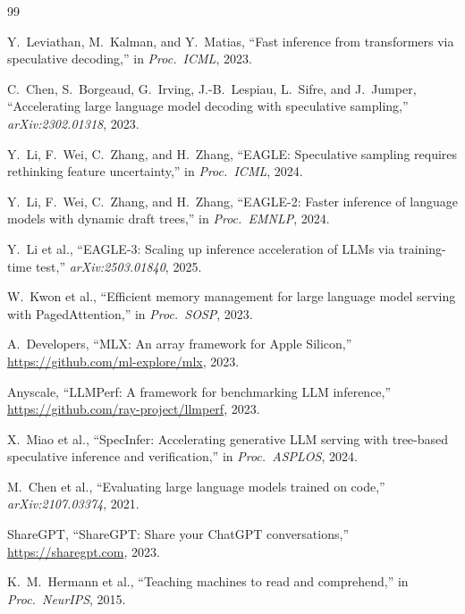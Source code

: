 \documentclass[10pt,twocolumn]{article}
\begin{document}
\begin{thebibliography}{99}

Y.~Leviathan, M.~Kalman, and Y.~Matias,
``Fast inference from transformers via speculative decoding,''
in \textit{Proc.\ ICML}, 2023.

C.~Chen, S.~Borgeaud, G.~Irving, J.-B.~Lespiau, L.~Sifre, and J.~Jumper,
``Accelerating large language model decoding with speculative sampling,''
\textit{arXiv:2302.01318}, 2023.

Y.~Li, F.~Wei, C.~Zhang, and H.~Zhang,
``EAGLE: Speculative sampling requires rethinking feature uncertainty,''
in \textit{Proc.\ ICML}, 2024.

Y.~Li, F.~Wei, C.~Zhang, and H.~Zhang,
``EAGLE-2: Faster inference of language models with dynamic draft trees,''
in \textit{Proc.\ EMNLP}, 2024.

Y.~Li et al.,
``EAGLE-3: Scaling up inference acceleration of LLMs via training-time test,''
\textit{arXiv:2503.01840}, 2025.

W.~Kwon et al.,
``Efficient memory management for large language model serving with PagedAttention,''
in \textit{Proc.\ SOSP}, 2023.

A.~Developers,
``MLX: An array framework for Apple Silicon,''
\url{https://github.com/ml-explore/mlx}, 2023.

Anyscale,
``LLMPerf: A framework for benchmarking LLM inference,''
\url{https://github.com/ray-project/llmperf}, 2023.

X.~Miao et al.,
``SpecInfer: Accelerating generative LLM serving with tree-based speculative
inference and verification,''
in \textit{Proc.\ ASPLOS}, 2024.

M.~Chen et al.,
``Evaluating large language models trained on code,''
\textit{arXiv:2107.03374}, 2021.

ShareGPT,
``ShareGPT: Share your ChatGPT conversations,''
\url{https://sharegpt.com}, 2023.

K.~M.~Hermann et al.,
``Teaching machines to read and comprehend,''
in \textit{Proc.\ NeurIPS}, 2015. 


\end{thebibliography}
\end{document}
